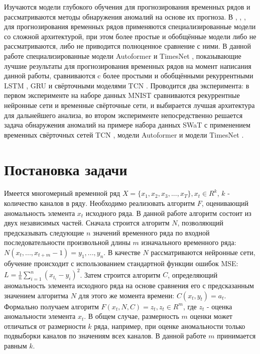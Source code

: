 \documentclass{article}
\begin{document}
Изучаются модели глубокого обучения для прогнозирования временных рядов и рассматриваются методы обнаружения аномалий на основе их прогноза. В \cite{darban2022deep}, \cite{wu2022autoformer}, \cite{wu2023timesnet}, \cite{zeng2022transformers} для прогнозирования временных рядов применяются специализированные модели со сложной архитектурой, при этом более простые и обобщённые модели либо не рассматриваются, либо не приводится полноценное сравнение с ними. В данной работе специализированные модели Autoformer \cite{wu2022autoformer} и TimesNet \cite{wu2023timesnet}, показывающие лучшие результаты для прогнозирования временных рядов \cite{wu2023timesnet} на момент написания данной работы, сравниваются c более простыми и обобщёнными рекуррентными LSTM \cite{staudemeyer2019understanding}, GRU \cite{dey2017gatevariants} и свёрточными моделями TCN \cite{bai2018empirical}. Проводится два эксперимента: в первом эксперименте на наборе данных MNIST сравниваются рекуррентные нейронные сети и временные свёрточные сети, и выбирается лучшая архитектура для дальнейшего анализа, во втором эксперименте непосредственно решается задача обнаружения аномалий на примере набора данных SWaT \cite{Goh2016ADT} с применением временных свёрточных сетей TCN \cite{bai2018empirical}, модели Autoformer \cite{wu2022autoformer} и модели TimesNet \cite{wu2023timesnet}.
\section{Постановка задачи}
\label{sec:headings}

Имеется многомерный временной ряд $X = \{x_1, x_2, x_3, ..., x_T\}, x_t \in R^k$, $k$ - количество каналов в ряду. Необходимо реализовать алгоритм $F$, оценивающий аномальность элемента $x_t$ исходного ряда. В данной работе алгоритм состоит из двух независимых частей. Сначала строится алгоритм $N$, позволяющий предсказывать следующие $n$ значений временного ряда по входной последовательности произвольной длины $m$ изначального временного ряда: $N(x_t, ..., x_{t + m} - 1) = y_{1}, ..., y_{n} $. В качестве $N$ рассматриваются нейронные сети, обучение происходит с использованием стандартной функции ошибок MSE: $L = \frac{1}{n} \sum_{i=1}^{n} (x_{t_i} - y_i)^2$. Затем строится алгоритм $C$, определяющий аномальность элемента исходного ряда на основе сравнения его с предсказанным значением алгоритма $N$ для этого же момента времени: $C(x_t, y_t) = a_t$. Формально получаем алгоритм $F(x_t, N, C) = z_t, z_t \in R^m$, где $z_t$ - оценка аномальности элемента $x_t$. В общем случае, размерность $m$ оценки может отличаться от размерности $k$ ряда, например, при оценке аномальности только подвыборки каналов по значениям всех каналов. В данной работе $m$ принимается равным $k$.
\end{document}
